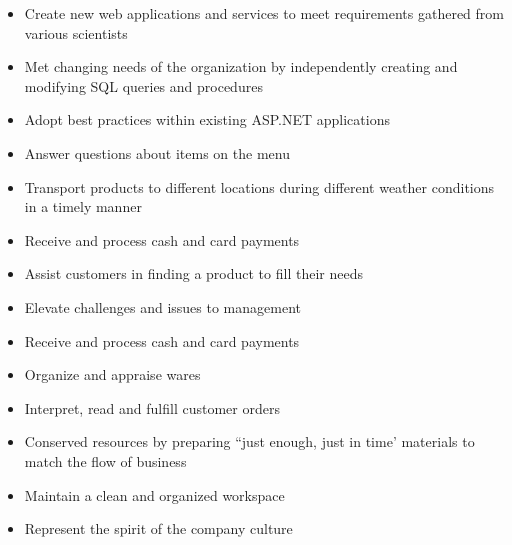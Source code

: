 \documentclass[10pt,a4paper,ragged2e,withhyper]{altacv}
\begin{document}
		\begin{paracol}{2}

		

			\cvtag{\LaTeX}

			\begin{itemize}
				\item Create new web applications and services to meet requirements gathered from various scientists
				\item Met changing needs of the organization by independently creating and modifying SQL queries and procedures
				\item Adopt best practices within existing ASP.NET applications
			\end{itemize}
			\divider
			\begin{itemize}
				\item Answer questions about items on the menu
				\item Transport products to different locations during different weather conditions in a timely manner
				\item Receive and process cash and card payments
			\end{itemize}
			\divider
			\begin{itemize}
				\item Assist customers in finding a product to fill their needs
				\item Elevate challenges and issues to management
				\item	Receive and process cash and card payments
				\item Organize and appraise wares
			\end{itemize}
			\divider
			\begin{itemize}
				\item Interpret, read and fulfill customer orders
				\item Conserved resources by preparing ``just enough, just in time' materials to match the flow of business
				\item Maintain a clean and organized workspace
				\item Represent the spirit of the company culture
			\end{itemize}
			\medskip


\end{paracol}
\end{document}
